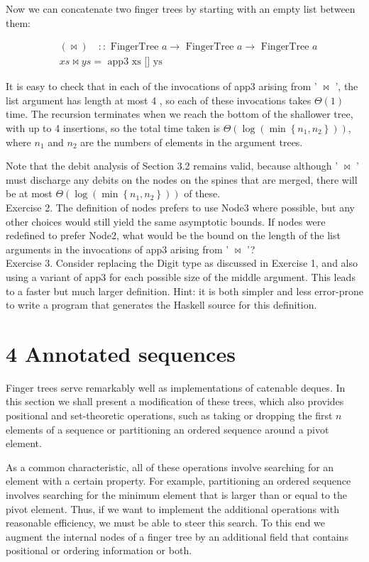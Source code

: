 \documentclass[10pt]{article}
\begin{document}
Now we can concatenate two finger trees by starting with an empty list between them:

$$
\begin{aligned}
& (\bowtie) \quad:: \text { FingerTree } a \rightarrow \text { FingerTree } a \rightarrow \text { FingerTree } a \\
& x s \bowtie y s=\text { app3 xs [] ys }
\end{aligned}
$$

It is easy to check that in each of the invocations of app3 arising from ' $\bowtie$ ', the list argument has length at most 4 , so each of these invocations takes $\Theta(1)$ time. The recursion terminates when we reach the bottom of the shallower tree, with up to 4 insertions, so the total time taken is $\Theta\left(\log \left(\min \left\{n_{1}, n_{2}\right\}\right)\right)$, where $n_{1}$ and $n_{2}$ are the numbers of elements in the argument trees.

Note that the debit analysis of Section 3.2 remains valid, because although ' $\bowtie$ ' must discharge any debits on the nodes on the spines that are merged, there will be at most $\Theta\left(\log \left(\min \left\{n_{1}, n_{2}\right\}\right)\right)$ of these.\\
Exercise 2. The definition of nodes prefers to use Node3 where possible, but any other choices would still yield the same asymptotic bounds. If nodes were redefined to prefer Node2, what would be the bound on the length of the list arguments in the invocations of app3 arising from ' $\bowtie$ '?\\
Exercise 3. Consider replacing the Digit type as discussed in Exercise 1, and also using a variant of app3 for each possible size of the middle argument. This leads to a faster but much larger definition. Hint: it is both simpler and less error-prone to write a program that generates the Haskell source for this definition.

\section*{4 Annotated sequences}
Finger trees serve remarkably well as implementations of catenable deques. In this section we shall present a modification of these trees, which also provides positional and set-theoretic operations, such as taking or dropping the first $n$ elements of a sequence or partitioning an ordered sequence around a pivot element.

As a common characteristic, all of these operations involve searching for an element with a certain property. For example, partitioning an ordered sequence involves searching for the minimum element that is larger than or equal to the pivot element. Thus, if we want to implement the additional operations with reasonable efficiency, we must be able to steer this search. To this end we augment the internal nodes of a finger tree by an additional field that contains positional or ordering information or both.
\end{document}
